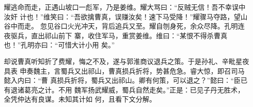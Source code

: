 耀逃命而走，正遇山坡口一彪军，乃是姜维。耀大骂曰：“反贼无信！吾不幸误中汝奸
计也！”维笑曰：“吾欲擒曹真，误赚汝矣！速下马受降！”耀骤马夺路，望山谷中而走。
忽见谷口火光冲天，背后追兵又至。耀自刎身死，余众尽降。孔明连夜驱兵，直出祁山前下
寨，收住军马，重赏姜维。维曰：“某恨不得杀曹真也！”孔明亦曰：“可惜大计小用
矣。”

却说曹真听知折了费耀，悔之不及，遂与郭淮商议退兵之策。于是孙礼、辛毗星夜具表
申奏魏主，言蜀兵又出祁山，曹真损兵折将，势甚危急。睿大惊，即召司马懿入内曰：“曹
真损兵折将，蜀兵又出祁山。卿有何策，可以退之？”懿曰：“臣已有退诸葛亮之计。不用
魏军扬武耀威，蜀兵自然走矣。”正是：已见子丹无胜术，全凭仲达有良谋。未知其计如
何，且看下文分解。